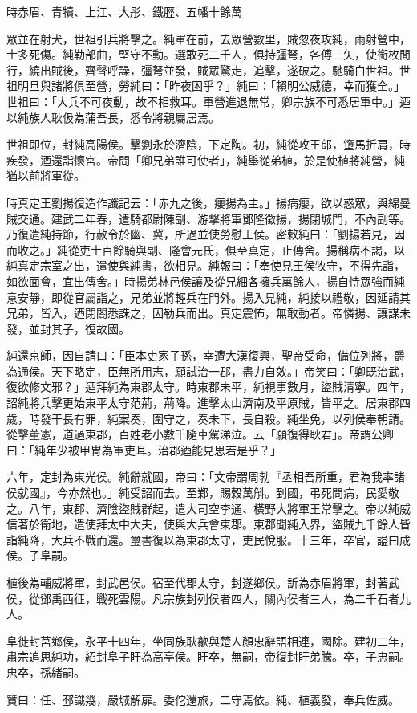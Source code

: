 \begin{pinyinscope}
時赤眉、青犢、上江、大彤、鐵脛、五幡十餘萬

眾並在射犬，世祖引兵將擊之。純軍在前，去眾營數里，賊忽夜攻純，雨射營中，士多死傷。純勒部曲，堅守不動。選敢死二千人，俱持彊弩，各傅三矢，使銜枚閒行，繞出賊後，齊聲呼譟，彊弩並發，賊眾驚走，追擊，遂破之。馳騎白世祖。世祖明旦與諸將俱至營，勞純曰：「昨夜困乎？」純曰：「賴明公威德，幸而獲全。」世祖曰：「大兵不可夜動，故不相救耳。軍營進退無常，卿宗族不可悉居軍中。」迺以純族人耿伋為蒲吾長，悉令將親屬居焉。

世祖即位，封純高陽侯。擊劉永於濟陰，下定陶。初，純從攻王郎，墯馬折肩，時疾發，迺還詣懷宮。帝問「卿兄弟誰可使者」，純舉從弟植，於是使植將純營，純猶以前將軍從。

時真定王劉揚復造作讖記云：「赤九之後，癭揚為主。」揚病癭，欲以惑眾，與綿曼賊交通。建武二年春，遣騎都尉陳副、游擊將軍鄧隆徵揚，揚閉城門，不內副等。乃復遣純持節，行赦令於幽、冀，所過並使勞慰王侯。密敕純曰：「劉揚若見，因而收之。」純從吏士百餘騎與副、隆會元氏，俱至真定，止傳舍。揚稱病不謁，以純真定宗室之出，遣使與純書，欲相見。純報曰：「奉使見王侯牧守，不得先詣，如欲面會，宜出傳舍。」時揚弟林邑侯讓及從兄細各擁兵萬餘人，揚自恃眾強而純意安靜，即從官屬詣之，兄弟並將輕兵在門外。揚入見純，純接以禮敬，因延請其兄弟，皆入，迺閉閤悉誅之，因勒兵而出。真定震怖，無敢動者。帝憐揚、讓謀未發，並封其子，復故國。

純還京師，因自請曰：「臣本吏家子孫，幸遭大漢復興，聖帝受命，備位列將，爵為通侯。天下略定，臣無所用志，願試治一郡，盡力自效。」帝笑曰：「卿既治武，復欲修文邪？」迺拜純為東郡太守。時東郡未平，純視事數月，盜賊清寧。四年，詔純將兵擊更始東平太守范荊，荊降。進擊太山濟南及平原賊，皆平之。居東郡四歲，時發干長有罪，純案奏，圍守之，奏未下，長自殺。純坐免，以列侯奉朝請。從擊董憲，道過東郡，百姓老小數千隨車駕涕泣。云「願復得耿君」。帝謂公卿曰：「純年少被甲冑為軍吏耳。治郡迺能見思若是乎？」

六年，定封為東光侯。純辭就國，帝曰：「文帝謂周勃『丞相吾所重，君為我率諸侯就國』，今亦然也。」純受詔而去。至鄴，賜穀萬斛。到國，弔死問病，民愛敬之。八年，東郡、濟陰盜賊群起，遣大司空李通、橫野大將軍王常擊之。帝以純威信著於衛地，遣使拜太中大夫，使與大兵會東郡。東郡聞純入界，盜賊九千餘人皆詣純降，大兵不戰而還。璽書復以為東郡太守，吏民悅服。十三年，卒官，謚曰成侯。子阜嗣。

植後為輔威將軍，封武邑侯。宿至代郡太守，封遂鄉侯。訢為赤眉將軍，封著武侯，從鄧禹西征，戰死雲陽。凡宗族封列侯者四人，關內侯者三人，為二千石者九人。

阜徙封莒鄉侯，永平十四年，坐同族耿歙與楚人顏忠辭語相連，國除。建初二年，肅宗追思純功，紹封阜子盱為高亭侯。盱卒，無嗣，帝復封盱弟騰。卒，子忠嗣。忠卒，孫緒嗣。

贊曰：任、邳識幾，嚴城解扉。委佗還旅，二守焉依。純、植義發，奉兵佐威。


\end{pinyinscope}